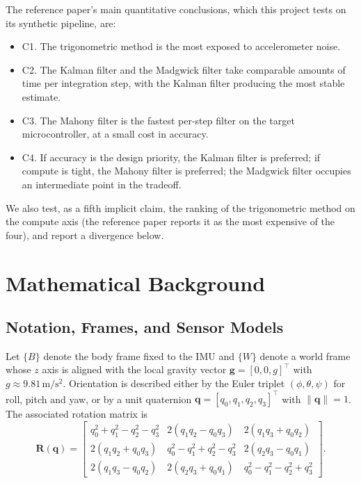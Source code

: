 \documentclass[conference]{IEEEtran}
\newcommand{\bm}[1]{\mathbf{#1}}
\begin{document}
The reference paper's main quantitative conclusions, which this
project tests on its synthetic pipeline, are:
\begin{itemize}
\item C1. The trigonometric method is the most exposed to
accelerometer noise.
\item C2. The Kalman filter and the Madgwick filter take comparable
amounts of time per integration step, with the Kalman filter
producing the most stable estimate.
\item C3. The Mahony filter is the fastest per-step filter on the
target microcontroller, at a small cost in accuracy.
\item C4. If accuracy is the design priority, the Kalman filter is
preferred; if compute is tight, the Mahony filter is preferred;
the Madgwick filter occupies an intermediate point in the
tradeoff.
\end{itemize}
We also test, as a fifth implicit claim, the ranking of the
trigonometric method on the compute axis (the reference paper
reports it as the most expensive of the four), and report a
divergence below.

\section{Mathematical Background}\label{sec:math}

\subsection{Notation, Frames, and Sensor Models}

Let $\{B\}$ denote the body frame fixed to the IMU and $\{W\}$
denote a world frame whose $z$ axis is aligned with the local
gravity vector $\bm{g} = [0,0,g]^\top$ with $g \approx
9.81\,\mathrm{m}/\mathrm{s}^2$. Orientation is described either by
the Euler triplet $(\phi,\theta,\psi)$ for roll, pitch and yaw, or
by a unit quaternion $\bm{q} = [q_0,q_1,q_2,q_3]^\top$ with
$\|\bm{q}\| = 1$. The associated rotation matrix is
\begin{equation}
\bm{R}(\bm{q}) =
\begin{bmatrix}
q_0^2+q_1^2-q_2^2-q_3^2 & 2(q_1q_2-q_0q_3) & 2(q_1q_3+q_0q_2)\\
2(q_1q_2+q_0q_3) & q_0^2-q_1^2+q_2^2-q_3^2 & 2(q_2q_3-q_0q_1)\\
2(q_1q_3-q_0q_2) & 2(q_2q_3+q_0q_1) & q_0^2-q_1^2-q_2^2+q_3^2
\end{bmatrix}.
\end{equation}
\end{document}
